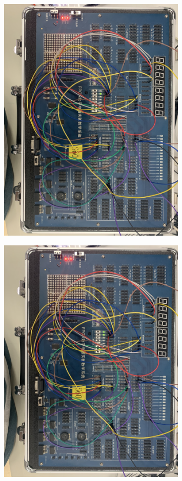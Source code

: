 \documentclass[UTF8, a4paper, 11pt]{article}
\begin{document}
\begin{figure}[H]
    \centering
    \includegraphics[width=0.8\textwidth]{箱010.png}
\end{figure}
\begin{figure}[H]
    \centering
    \includegraphics[width=0.8\textwidth]{箱011.png}
\end{figure}
\end{document}
